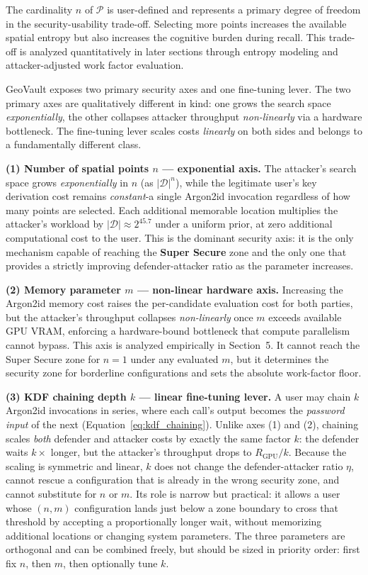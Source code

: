 \documentclass[journal,article,submit,pdftex,moreauthors]{Definitions/mdpi}
\newcommand{\add}[1]{#1}
\newcommand{\add}[1]{\added{#1}}
\begin{document}
The cardinality $n$ of $\mathcal{P}$ is user-defined and represents a primary degree of freedom in the security-usability trade-off. Selecting more points increases the available spatial entropy but also increases the cognitive burden during recall. This trade-off is analyzed quantitatively in later sections through entropy modeling and attacker-adjusted work factor evaluation.

\add{GeoVault exposes two primary security axes and one fine-tuning lever. The two primary axes are qualitatively different in kind: one grows the search space \emph{exponentially}, the other collapses attacker throughput \emph{non-linearly} via a hardware bottleneck. The fine-tuning lever scales costs \emph{linearly} on both sides and belongs to a fundamentally different class.}

\add{\textbf{(1) Number of spatial points $n$ — exponential axis.} The attacker's search space grows \emph{exponentially} in $n$ (as $|\mathcal{D}|^n$), while the legitimate user's key derivation cost remains \emph{constant}-a single Argon2id invocation regardless of how many points are selected. Each additional memorable location multiplies the attacker's workload by $|\mathcal{D}| \approx 2^{45.7}$ under a uniform prior, at zero additional computational cost to the user. This is the dominant security axis: it is the only mechanism capable of reaching the \textbf{Super Secure} zone and the only one that provides a strictly improving defender-attacker ratio as the parameter increases.}

\add{\textbf{(2) Memory parameter $m$ — non-linear hardware axis.} Increasing the Argon2id memory cost raises the per-candidate evaluation cost for both parties, but the attacker's throughput collapses \emph{non-linearly} once $m$ exceeds available GPU VRAM, enforcing a hardware-bound bottleneck that compute parallelism cannot bypass. This axis is analyzed empirically in Section~5. It cannot reach the Super Secure zone for $n=1$ under any evaluated $m$, but it determines the security zone for borderline configurations and sets the absolute work-factor floor.}

\add{\textbf{(3) KDF chaining depth $k$ — linear fine-tuning lever.} A user may chain $k$ Argon2id invocations in series, where each call's output becomes the \emph{password input} of the next (Equation~\ref{eq:kdf_chaining}). Unlike axes (1) and (2), chaining scales \emph{both} defender and attacker costs by exactly the same factor $k$: the defender waits $k\times$ longer, but the attacker's throughput drops to $R_\text{GPU}/k$. Because the scaling is symmetric and linear, $k$ does not change the defender-attacker ratio $\eta$, cannot rescue a configuration that is already in the wrong security zone, and cannot substitute for $n$ or $m$. Its role is narrow but practical: it allows a user whose $(n, m)$ configuration lands just below a zone boundary to cross that threshold by accepting a proportionally longer wait, without memorizing additional locations or changing system parameters. The three parameters are orthogonal and can be combined freely, but should be sized in priority order: first fix $n$, then $m$, then optionally tune $k$.}
\end{document}
